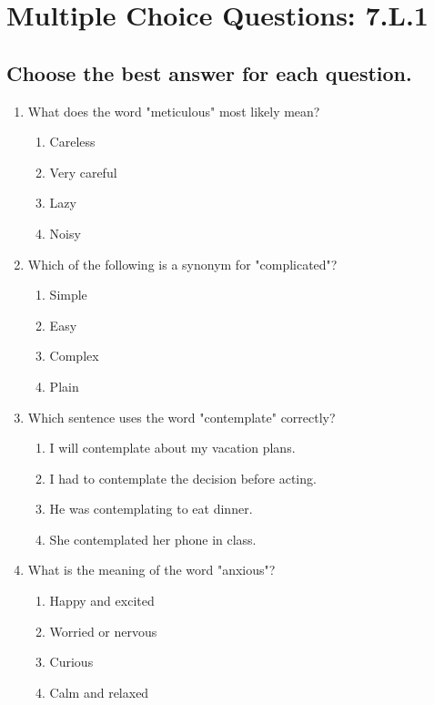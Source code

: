 \documentclass[12pt]{article}
\begin{document}
\onehalfspacing

\section*{Multiple Choice Questions: 7.L.1}

\subsection*{Choose the best answer for each question.}

\begin{enumerate}

\item What does the word "meticulous" most likely mean? 
\begin{enumerate}[label=\Alph*.]
    \item Careless
    \item Very careful
    \item Lazy
    \item Noisy
\end{enumerate}

\vspace{0.5cm}

\item Which of the following is a synonym for "complicated"?
\begin{enumerate}[label=\Alph*.]
    \item Simple
    \item Easy
    \item Complex
    \item Plain
\end{enumerate}

\vspace{0.5cm}

\item Which sentence uses the word "contemplate" correctly?
\begin{enumerate}[label=\Alph*.]
    \item I will contemplate about my vacation plans.
    \item I had to contemplate the decision before acting.
    \item He was contemplating to eat dinner.
    \item She contemplated her phone in class.
\end{enumerate}

\vspace{0.5cm}

\item What is the meaning of the word "anxious"?
\begin{enumerate}[label=\Alph*.]
    \item Happy and excited
    \item Worried or nervous
    \item Curious
    \item Calm and relaxed
\end{enumerate}


\end{enumerate}
\end{document}
